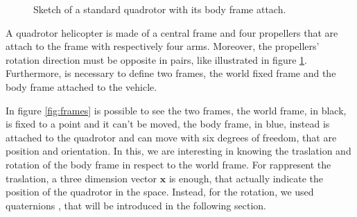 \begin{figure}[h]
	\caption{Sketch of a standard quadrotor with its body frame attach.}
	\label{fig:quadrtotor}
\end{figure}

\noindent A quadrotor helicopter is made of a central frame and four propellers that are attach to the frame with respectively four arms. Moreover, the propellers' rotation direction must be opposite in pairs, like illustrated in figure \ref{fig:quadrtotor}. \newline
\noindent Furthermore, is necessary to define two frames, the world fixed frame and the body frame attached to the vehicle.

\noindent In figure \ref{fig:frames} is possible to see the two frames, the world frame, in black, is fixed to a point and it can't be moved, the body frame, in blue, instead is attached to the quadrotor and can move with six degrees of freedom, that are position and orientation. In this, we are interesting in knowing the traslation and rotation of the body frame in respect to the world frame. For rappresent the traslation, a three dimension vector $\mathbf{x}$ is enough, that actually indicate the position of the quadrotor in the space. Instead, for the rotation, we used quaternions \cite{quaternion}, that will be introduced in the following section.

